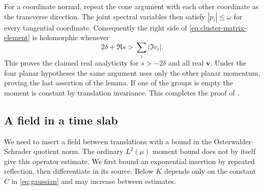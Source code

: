 \documentclass[11pt, letterpaper, reqno]{amsart}
\theoremstyle{definition}
\theoremstyle{remark}
\newcommand{\bfv}{\mathbf{v}}
\begin{document}
For a coordinate normal, repeat the cone argument with each other
coordinate as the transverse direction. The joint spectral variables
then satisfy $|p_i|\leq\omega$ for every tangential coordinate.
Consequently the right side of \eqref{eq:cluster-matrix-element} is
holomorphic whenever
\begin{equation}
 2\delta+\Re s>\sum_i|\Im v_i|.
\end{equation}
This proves the claimed real analyticity for $s>-2\delta$ and all
real $\bfv$. Under the four planar hypotheses the same argument uses
only the other planar momentum, proving the last assertion of the
lemma. If one of the groups is empty the moment is constant by
translation invariance. This completes the proof of
.

\subsection{A field in a time slab}\label{subsec:slab}

We need to insert a field between translations with a bound in the
Osterwalder--Schrader quotient norm. The ordinary $L^2(\mu)$ moment
bound does not by itself give this operator estimate. We first bound
an exponential insertion by repeated reflection, then differentiate
in its source. Below $K$ depends only on the constant $C$ in
\eqref{eq:gaussian} and may increase between estimates.
\end{document}
